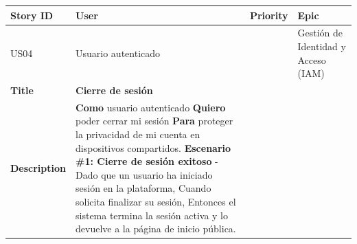 {\def\LTcaptype{none} %
\begin{longtable}[]{@{}
  >{\raggedright\arraybackslash}p{}
  >{\raggedright\arraybackslash}p{}
  >{\raggedright\arraybackslash}p{}
  >{\raggedright\arraybackslash}p{}@{}}
\toprule\noalign{}
\begin{minipage}[b]{\linewidth}\raggedright
Story ID
\end{minipage} & \begin{minipage}[b]{\linewidth}\raggedright
User
\end{minipage} & \begin{minipage}[b]{\linewidth}\raggedright
Priority
\end{minipage} & \begin{minipage}[b]{\linewidth}\raggedright
Epic
\end{minipage} \\
\midrule\noalign{}
\endhead
\bottomrule\noalign{}
\endlastfoot
US04 & Usuario autenticado & 1 & Gestión de Identidad y Acceso (IAM) \\
\textbf{Title} & \textbf{Cierre de sesión} & & \\
\textbf{Description} & \textbf{Como} usuario autenticado \textbf{Quiero}
poder cerrar mi sesión \textbf{Para} proteger la privacidad de mi cuenta
en dispositivos compartidos. \textbf{Escenario \#1: Cierre de sesión
exitoso} - Dado que un usuario ha iniciado sesión en la plataforma,
Cuando solicita finalizar su sesión, Entonces el sistema termina la
sesión activa y lo devuelve a la página de inicio pública. & & \\
\end{longtable}
}

